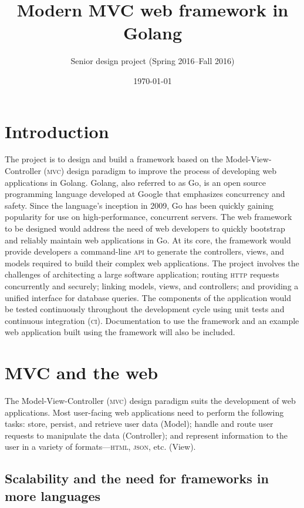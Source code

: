 \documentclass{article}
\title{Modern MVC web framework in Golang}
\author{Senior design project (Spring 2016--Fall 2016)}
\date{\today}
\begin{document}
\maketitle

\section{Introduction}

The project is to design and build a framework based on the Model-View-Controller (\textsc{mvc}) design paradigm to improve the process of developing web applications in Golang. Golang, also referred to as Go, is an open source programming language developed at Google that emphasizes concurrency and safety. Since the language’s inception in 2009, Go has been quickly gaining popularity for use on high-performance, concurrent servers. The web framework to be designed would address the need of web developers to quickly bootstrap and reliably maintain web applications in Go. At its core, the framework would provide developers a command-line \textsc{api} to generate the controllers, views, and models required to build their complex web applications.  The project involves the challenges of architecting a large software application; routing \textsc{http} requests concurrently and securely; linking models, views, and controllers; and providing a unified interface for database queries. The components of the application would be tested continuously throughout the development cycle using unit tests and continuous integration (\textsc{ci}). Documentation to use the framework and an example web application built using the framework will also be included. 

\section{MVC and the web}

The Model-View-Controller (\textsc{mvc}) design paradigm suits the development of web applications. Most user-facing web applications need to perform the following tasks: store, persist, and retrieve user data (Model); handle and route user requests to manipulate the data (Controller); and represent information to the user in a variety of formats---\textsc{html, json}, etc. (View). 

\subsection{Scalability and the need for frameworks in more languages}
\end{document}

